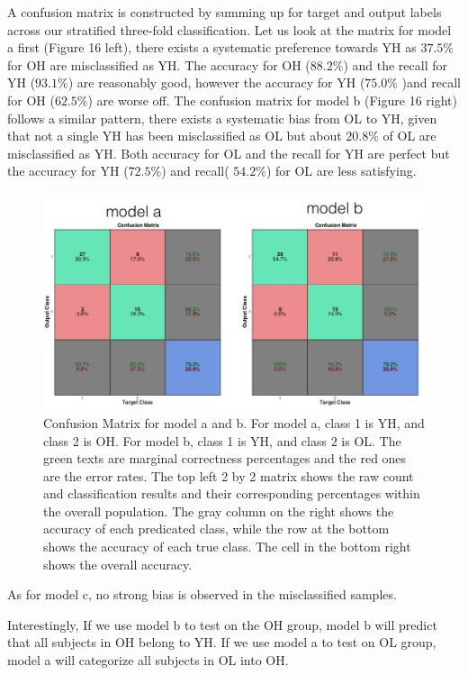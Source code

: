 \documentclass[a4paper,11pt,oneside]{article}
\begin{document}
A confusion matrix is constructed by summing up for target and output labels across our stratified three-fold classification. Let us look at the matrix for model a first (Figure 16 left), there exists a systematic preference towards YH as $37.5\%$ for OH are misclassified as YH. The accuracy for OH ($88.2\%$) and the recall for YH ($93.1\%$) are reasonably good, however the accuracy for YH ($75.0\%$ )and recall for OH ($62.5\%$) are worse off.
The confusion matrix for model b (Figure 16 right) follows a similar pattern, there exists a systematic bias from OL to YH, given that not a single YH has been misclassified as OL but about $20.8\%$ of OL are misclassified as YH. Both accuracy for OL and the recall for YH are perfect but the accuracy for YH ($72.5\%$) and recall( $54.2\%$) for OL are less satisfying.
\begin{figure}[h!]
	\centering
	\includegraphics[width=\textwidth]{img/confusion}
	\caption{Confusion Matrix for model a and b. For model a, class 1 is YH, and class 2 is OH. For model b, class 1 is YH, and class 2 is OL. The green texts are marginal correctness percentages and the red ones are the error rates. The top left 2 by 2 matrix shows the raw count and classification results and their corresponding percentages within the overall population. The gray column on the right shows the accuracy of each predicated class, while the row at the bottom shows the accuracy of each true class. The cell in the bottom right shows the overall accuracy. }
\end{figure}
As for model c, no strong bias is observed in the misclassified samples.

Interestingly, If we use model b to test on the OH group, model b will predict that all subjects in OH belong to YH. If we use model a to test on OL group, model a will categorize all subjects in OL into OH.
\end{document}
